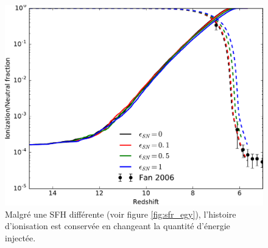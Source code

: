 \begin{figure}
        \includegraphics[width=.95\textwidth]{img/03/sneff_xion.pdf} 
        \caption[Fonction d'ionisation en fonction de la quantité d'énergie injectée]{Malgré une SFH différente (voir figure \ref{fig:sfr_egy}), l'histoire d'ionisation est conservée en changeant la quantité d'énergie injectée.
        }
 		\label{fig:xion_sneff}
\end{figure}
